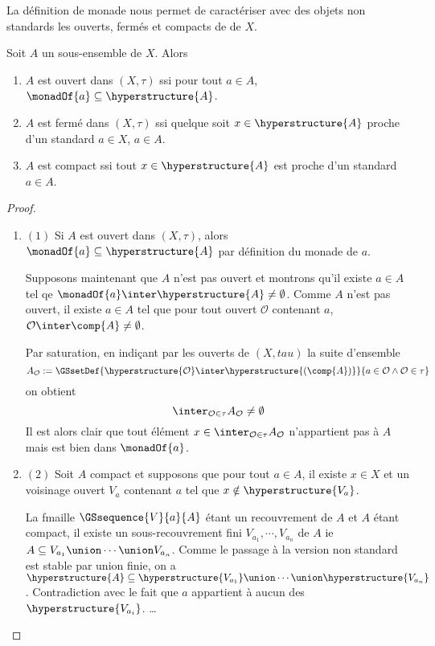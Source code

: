 La définition de monade nous permet de caractériser avec des objets non
standards les ouverts, fermés et compacts de
de $X$.

\begin{proposition}
	Soit $A$ un sous-ensemble de $X$. Alors
	\begin{enumerate}
		\item $A$ est ouvert dans $(X, \tau)$ ssi pour tout $a \in A$, $\monadOf{a}
			\subseteq \hyperstructure{A}$.
		\item $A$ est fermé dans $(X, \tau)$ ssi quelque soit $x \in
			\hyperstructure{A}$ proche d'un standard $a \in X$, $a \in A$.
		\item $A$ est compact ssi tout $x \in \hyperstructure{A}$ est proche
			d'un standard $a \in A$.
	\end{enumerate}
\end{proposition}

\ifdefined\outputproof
\begin{proof}
	\begin{enumerate}
		\item $(1)$ Si $A$ est ouvert dans $(X, \tau)$, alors $\monadOf{a}
			\subseteq \hyperstructure{A}$ par définition du monade de $a$.

			Supposons maintenant que $A$ n'est pas ouvert et montrons qu'il
			existe $a \in A$ tel qe $\monadOf{a} \inter \hyperstructure{A} \neq
			\emptyset$. Comme $A$ n'est pas ouvert, il existe $a \in A$ tel que
			pour tout ouvert $\mathcal{O}$ contenant $a$, $\mathcal{O} \inter
			\comp{A} \neq \emptyset$.

			Par saturation, en indiçant par les ouverts de $(X, tau)$ la suite
			d'ensemble
			\begin{equation}
				A_{\mathcal{O}} := \GSsetDef{\hyperstructure{\mathcal{O}} \inter
				\hyperstructure{(\comp{A})}}{a \in \mathcal{O} \wedge
				\mathcal{O} \in \tau}
			\end{equation}
			on obtient
			\begin{equation}
				\inter_{\mathcal{O} \in \tau} A_{\mathcal{O}} \neq \emptyset
			\end{equation}
			Il est alors clair que tout élément $x \in \inter_{\mathcal{O} \in
		\tau} A_{\mathcal{O}}$ n'appartient pas à $A$ mais est bien dans $\monadOf{a}$.

		\item $(2)$ Soit $A$ compact et supposons que pour tout $a \in A$, il
			existe $x \in X$ et un voisinage ouvert $V_{a}$ contenant $a$ tel
			que $x \notin \hyperstructure{V_{a}}$.

			La fmaille $\GSsequence{V}{a}{A}$ étant un recouvrement de $A$ et
			$A$ étant compact, il existe un sous-recouvrement fini $V_{a_{1}},
			\cdots, V_{a_{n}}$ de $A$ ie $A \subseteq V_{a_{1}} \union \cdots
			\union V_{a_{n}}$. Comme le passage à la version non standard est
			stable par union finie, on a $\hyperstructure{A} \subseteq
			\hyperstructure{V_{a_{1}}} \union \cdots \union
			\hyperstructure{V_{a_{n}}}$. Contradiction avec le fait que $a$
			appartient à aucun des $\hyperstructure{V_{a_{i}}}$.
			\ldots
	\end{enumerate}
\end{proof}
\fi


